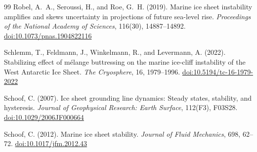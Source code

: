 \documentclass[11pt]{article}
\newcommand{\doi}[1]{\href{https://doi.org/#1}{doi:#1}}
\begin{document}
\begin{thebibliography}{99}
Robel, A.~A., Seroussi, H., and Roe, G.~H. (2019).
Marine ice sheet instability amplifies and skews uncertainty in projections of future sea-level rise.
\textit{Proceedings of the National Academy of Sciences}, 116(30), 14887--14892.
\doi{10.1073/pnas.1904822116}

Schlemm, T., Feldmann, J., Winkelmann, R., and Levermann, A. (2022).
Stabilizing effect of m\'{e}lange buttressing on the marine ice-cliff instability of the {W}est {A}ntarctic {I}ce {S}heet.
\textit{The Cryosphere}, 16, 1979--1996.
\doi{10.5194/tc-16-1979-2022}

Schoof, C. (2007).
Ice sheet grounding line dynamics: Steady states, stability, and hysteresis.
\textit{Journal of Geophysical Research: Earth Surface}, 112(F3), F03S28.
\doi{10.1029/2006JF000664}

Schoof, C. (2012).
Marine ice sheet stability.
\textit{Journal of Fluid Mechanics}, 698, 62--72.
\doi{10.1017/jfm.2012.43}

\end{thebibliography}
\end{document}
